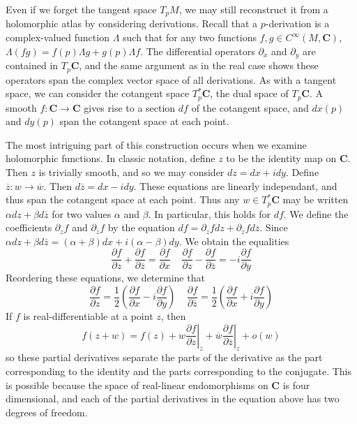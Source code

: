 Even if we forget the tangent space $T_p M$, we may still reconstruct it from a holomorphic atlas by considering derivations. Recall that a $p$-derivation is a complex-valued function $\Lambda$ such that for any two functions $f,g \in C^\infty(M,\mathbf{C})$, $\Lambda (fg) = f(p) \Lambda g + g(p) \Lambda f$. The differential operators $\partial_x$ and $\partial_y$ are contained in $T_p \mathbf{C}$, and the same argument as in the real case shows these operators span the complex vector space of all derivations. As with a tangent space, we can consider the cotangent space $T_p^* \mathbf{C}$, the dual space of $T_p \mathbf{C}$. A smooth $f: \mathbf{C} \to \mathbf{C}$ gives rise to a section $df$ of the cotangent space, and $dx(p)$ and $dy(p)$ span the cotangent space at each point.

The most intriguing part of this construction occurs when we examine holomorphic functions. In classic notation, define $z$ to be the identity map on $\mathbf{C}$. Then $z$ is trivially smooth, and so we may consider $dz = dx + i dy$. Define $\overline{z} : w \to \overline{w}$. Then $d\overline{z} = dx - i dy$. These equations are linearly independant, and thus span the cotangent space at each point. Thus any $w \in T_p^* \mathbf{C}$ may be written $\alpha dz + \beta d\overline{z}$ for two values $\alpha$ and $\beta$. In particular, this holds for $df$. We define the coefficients $\partial_z f$ and $\partial_{\overline{z}} f$ by the equation $df = \partial_z f dz + \partial_{\overline{z}} f d\overline{z}$. Since $\alpha dz + \beta d\overline{z} = (\alpha + \beta) dx + i(\alpha - \beta) dy$. We obtain the equalities
%
\[ \frac{\partial f}{\partial z} + \frac{\partial f}{\partial \overline{z}} = \frac{\partial f}{\partial x}\ \ \ \ \ \frac{\partial f}{\partial z} - \frac{\partial f}{\partial \overline{z}} = -i \frac{\partial f}{\partial y} \]
%
Reordering these equations, we determine that
%
\[ \frac{\partial f}{\partial z} = \frac{1}{2} \left( \frac{\partial f}{\partial x} - i \frac{\partial f}{\partial y} \right)\ \ \ \ \ \frac{\partial f}{\partial \overline{z}} = \frac{1}{2} \left( \frac{\partial f}{\partial x} + i \frac{\partial f}{\partial y} \right) \]
%
If $f$ is real-differentiable at a point $z$, then
%
\[ f(z + w) = f(z) + w \left. \frac{\partial f}{\partial z} \right|_z + \overline{w} \left. \frac{\partial f}{\partial \overline{z}} \right|_z + o(w) \]
%
so these partial derivatives separate the parts of the derivative as the part corresponding to the identity and the parts corresponding to the conjugate. This is possible because the space of real-linear endomorphisms on $\mathbf{C}$ is four dimensional, and each of the partial derivatives in the equation above has two degrees of freedom.

